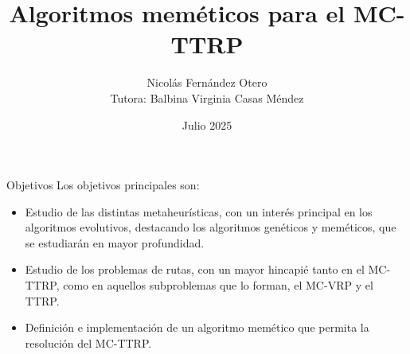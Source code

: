 \documentclass[aspectratio=169,table,xcdraw]{beamer}
\title{Algoritmos meméticos para el MC-TTRP}
\author{Nicolás Fernández Otero\\ \vspace{0.3cm} \small{Tutora: Balbina Virginia Casas Méndez}}
\institute{Facultad de Matemáticas - Grado en Matemáticas}
\date{Julio 2025}
\begin{document}
\begin{frame}[plain]%
    \titlepage%
\end{frame}
\begin{frame}{Objetivos}
    Los objetivos principales son:
    \begin{itemize}
    \item Estudio de las distintas metaheurísticas, con un interés principal en los algoritmos evolutivos, destacando los algoritmos genéticos y meméticos, que se estudiarán en mayor profundidad.
    \item Estudio de los problemas de rutas, con un mayor hincapié tanto en el MC-TTRP, como en aquellos subproblemas que lo forman, el MC-VRP y el TTRP.
    \item Definición e implementación de un algoritmo memético que permita la resolución del MC-TTRP.
\end{itemize}
\end{frame}
\end{document}
